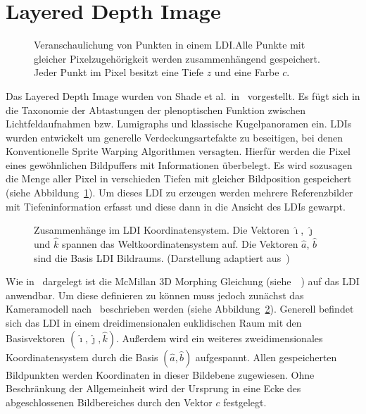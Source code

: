 \documentclass[hyperref, beleg, german]{cgvpub}
\begin{document}
\section{Layered Depth Image}

\begin{figure}
	\centering
	
	\caption{Veranschaulichung von Punkten in einem LDI.\@ Alle Punkte mit
		gleicher Pixelzugehörigkeit werden zusammenhängend gespeichert. Jeder
		Punkt im Pixel besitzt eine Tiefe \(z\) und eine Farbe \(c\).}%
	\label{fig:layereddepthimage}
\end{figure}

Das Layered Depth Image wurden von Shade et al.\ in~\cite{he1998layered}
vorgestellt. Es fügt sich in die Taxonomie der Abtastungen der plenoptischen
Funktion zwischen Lichtfeldaufnahmen bzw. Lumigraphs und klassische
Kugelpanoramen ein. LDIs wurden entwickelt um generelle Verdeckungsartefakte zu
beseitigen, bei denen Konventionelle Sprite Warping Algorithmen versagten.
Hierfür werden die Pixel eines gewöhnlichen Bildpuffers mit Informationen
überbelegt. Es wird sozusagen die Menge aller Pixel in verschieden Tiefen mit
gleicher Bildposition gespeichert (siehe
Abbildung~\ref{fig:layereddepthimage}). Um dieses LDI zu erzeugen werden
mehrere Referenzbilder mit Tiefeninformation erfasst und diese dann in die
Ansicht des LDIs gewarpt.

\begin{figure}
	\centering
	
	\caption{Zusammenhänge im LDI Koordinatensystem. Die Vektoren \( \hat{\imath}
		\), \( \hat{\jmath} \) und \( \hat{k} \) spannen das Weltkoordinatensystem
		auf. Die Vektoren \( \hat{a} \), \( \hat{b} \) sind die Basis LDI
		Bildraums. (Darstellung adaptiert aus~\cite{mcmillan1997image})}%
	\label{fig:ldicoord}
\end{figure}

Wie in~\cite{chang1999ldi} dargelegt ist die McMillan 3D Morphing Gleichung
(siehe~\cite{mcmillan1995list}~\cite{mcmillan1995plenoptic}) auf das LDI
anwendbar. Um diese definieren zu können muss jedoch zunächst das Kameramodell
nach~\cite{mcmillan1997image} beschrieben werden (siehe
Abbildung~\ref{fig:ldicoord}). Generell befindet sich das LDI in einem
dreidimensionalen euklidischen Raum mit den Basisvektoren \( (\hat{\imath},
\hat{\jmath}, \hat{k}) \). Außerdem wird ein weiteres zweidimensionales
Koordinatensystem durch die Basis \( (\hat{a}, \hat{b}) \) aufgespannt. Allen
gespeicherten Bildpunkten werden Koordinaten in dieser Bildebene zugewiesen.
Ohne Beschränkung der Allgemeinheit wird der Ursprung in eine Ecke des
abgeschlossenen Bildbereiches durch den Vektor \( c \) festgelegt.
\end{document}
